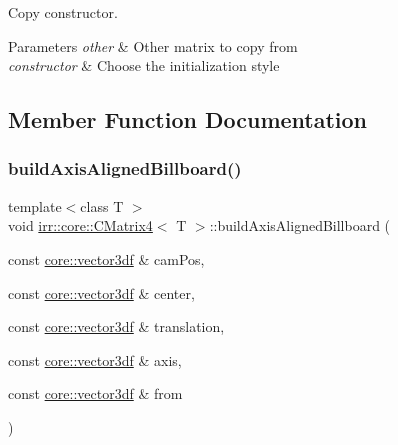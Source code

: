 Copy constructor. 


\begin{DoxyParams}{Parameters}
{\em other} & Other matrix to copy from \\
\hline
{\em constructor} & Choose the initialization style \\
\hline
\end{DoxyParams}


\subsection{Member Function Documentation}
\mbox{\label{classirr_1_1core_1_1CMatrix4_ad2dc80f2aed15900839389cf52f9e798}} 
\subsubsection{\texorpdfstring{build\+Axis\+Aligned\+Billboard()}{buildAxisAlignedBillboard()}\hspace{0.1cm}{\footnotesize\ttfamily [1/2]}}
{\footnotesize\ttfamily template$<$class T $>$ \\
void \hyperlink{classirr_1_1core_1_1CMatrix4}{irr\+::core\+::\+C\+Matrix4}$<$ T $>$\+::build\+Axis\+Aligned\+Billboard (\begin{DoxyParamCaption}\item[{const \hyperlink{namespaceirr_1_1core_ae6e2b2a6c552833ebbd5b7463d03586b}{core\+::vector3df} \&}]{cam\+Pos,  }\item[{const \hyperlink{namespaceirr_1_1core_ae6e2b2a6c552833ebbd5b7463d03586b}{core\+::vector3df} \&}]{center,  }\item[{const \hyperlink{namespaceirr_1_1core_ae6e2b2a6c552833ebbd5b7463d03586b}{core\+::vector3df} \&}]{translation,  }\item[{const \hyperlink{namespaceirr_1_1core_ae6e2b2a6c552833ebbd5b7463d03586b}{core\+::vector3df} \&}]{axis,  }\item[{const \hyperlink{namespaceirr_1_1core_ae6e2b2a6c552833ebbd5b7463d03586b}{core\+::vector3df} \&}]{from }\end{DoxyParamCaption})\hspace{0.3cm}{\ttfamily [inline]}}



